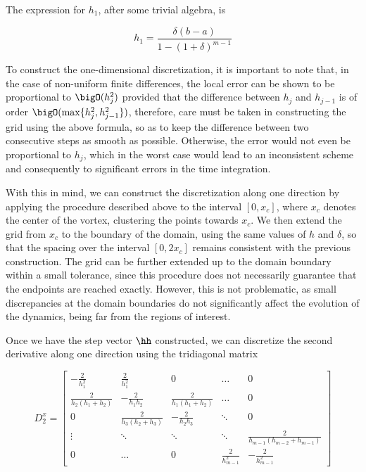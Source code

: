 The expression for $h_1$, after some trivial algebra, is

\[ h_1 = \frac{\delta(b - a)}{1 - (1 + \delta)^{m - 1}} \]

To construct the one-dimensional discretization, it is important to note that, in the case of non-uniform finite differences, the local error can be shown to be proportional to $\bigO(h_j^2)$ provided that the difference between $h_j$ and $h_{j-1}$ is of order $\bigO(\max\{h_j^2, h_{j-1}^2\})$, therefore, care must be taken in constructing the grid using the above formula, so as to keep the difference between two consecutive steps as smooth as possible. Otherwise, the error would not even be proportional to $h_j$, which in the worst case would lead to an inconsistent scheme and consequently to significant errors in the time integration.

With this in mind, we can construct the discretization along one direction by applying the procedure described above to the interval $[0, x_c]$, where $x_c$ denotes the center of the vortex, clustering the points towards $x_c$.  
We then extend the grid from $x_c$ to the boundary of the domain, using the same values of $h$ and $\delta$, so that the spacing over the interval $[0, 2x_c]$ remains consistent with the previous construction.  
The grid can be further extended up to the domain boundary within a small tolerance, since this procedure does not necessarily guarantee that the endpoints are reached exactly.  
However, this is not problematic, as small discrepancies at the domain boundaries do not significantly affect the evolution of the dynamics, being far from the regions of interest.

Once we have the step vector $\hh$ constructed, we can discretize the second derivative along one direction using the tridiagonal matrix

\[
    D_2^x =
    \begin{bmatrix}
        -\frac{2}{h_1^2} & \frac{2}{h_1^2} & 0 & \dots & 0 \\
        \frac{2}{h_2(h_1+h_2)} & -\frac{2}{h_1 h_2} & \frac{2}{h_1(h_1+h_2)} & \dots & 0 \\
        0 & \frac{2}{h_3(h_2+h_3)} & -\frac{2}{h_2 h_3} & \ddots & 0 \\
        \vdots & \ddots & \ddots & \ddots & \frac{2}{h_{m-1}(h_{m-2}+h_{m-1})} \\
        0 & \dots & 0 & \frac{2}{h_{m-1}^2} & -\frac{2}{h_{m-1}^2}
    \end{bmatrix}
\]


